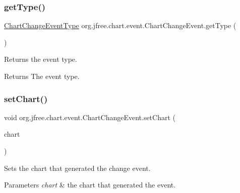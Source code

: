 \subsubsection{\texorpdfstring{get\+Type()}{getType()}}
{\footnotesize\ttfamily \mbox{\hyperlink{classorg_1_1jfree_1_1chart_1_1event_1_1_chart_change_event_type}{Chart\+Change\+Event\+Type}} org.\+jfree.\+chart.\+event.\+Chart\+Change\+Event.\+get\+Type (\begin{DoxyParamCaption}{ }\end{DoxyParamCaption})}

Returns the event type.

\begin{DoxyReturn}{Returns}
The event type. 
\end{DoxyReturn}
\mbox{\label{classorg_1_1jfree_1_1chart_1_1event_1_1_chart_change_event_a283a2b236228c7ba9910cd78aa6a4c26}} 
\subsubsection{\texorpdfstring{set\+Chart()}{setChart()}}
{\footnotesize\ttfamily void org.\+jfree.\+chart.\+event.\+Chart\+Change\+Event.\+set\+Chart (\begin{DoxyParamCaption}\item[{\mbox{\hyperlink{classorg_1_1jfree_1_1chart_1_1_j_free_chart}{J\+Free\+Chart}}}]{chart }\end{DoxyParamCaption})}

Sets the chart that generated the change event.


\begin{DoxyParams}{Parameters}
{\em chart} & the chart that generated the event. \\
\hline
\end{DoxyParams}
\mbox{\label{classorg_1_1jfree_1_1chart_1_1event_1_1_chart_change_event_aa8fada4be5c6748fc294c25a289ca97f}} 

